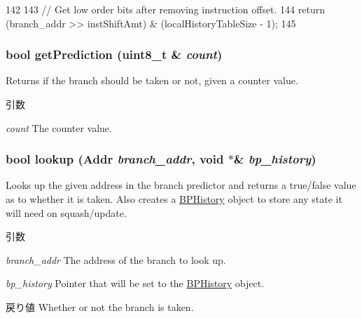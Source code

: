 \begin{DoxyCode}
142 {
143     // Get low order bits after removing instruction offset.
144     return (branch_addr >> instShiftAmt) & (localHistoryTableSize - 1);
145 }
\end{DoxyCode}
\hypertarget{classTournamentBP_ad0f11a4da5ded93ef111f9d8a1d40a54}{
\subsubsection[{getPrediction}]{\setlength{\rightskip}{0pt plus 5cm}bool getPrediction (uint8\_\-t \& {\em count})}}
\label{classTournamentBP_ad0f11a4da5ded93ef111f9d8a1d40a54}
Returns if the branch should be taken or not, given a counter value. 
\begin{DoxyParams}{引数}
\item[{\em count}]The counter value. \end{DoxyParams}
\hypertarget{classTournamentBP_a9c30d728e49473b5a3825835e98a10bc}{
\subsubsection[{lookup}]{\setlength{\rightskip}{0pt plus 5cm}bool lookup ({\bf Addr} {\em branch\_\-addr}, \/  void $\ast$\& {\em bp\_\-history})}}
\label{classTournamentBP_a9c30d728e49473b5a3825835e98a10bc}
Looks up the given address in the branch predictor and returns a true/false value as to whether it is taken. Also creates a \hyperlink{structTournamentBP_1_1BPHistory}{BPHistory} object to store any state it will need on squash/update. 
\begin{DoxyParams}{引数}
\item[{\em branch\_\-addr}]The address of the branch to look up. \item[{\em bp\_\-history}]Pointer that will be set to the \hyperlink{structTournamentBP_1_1BPHistory}{BPHistory} object. \end{DoxyParams}
\begin{DoxyReturn}{戻り値}
Whether or not the branch is taken. 
\end{DoxyReturn}



